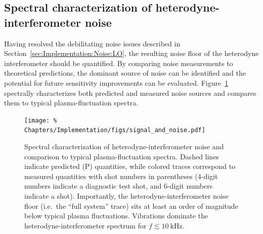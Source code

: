 \subsection{Spectral characterization of heterodyne-interferometer noise}
\label{sec:Implementation:Noise:interferometer}
Having resolved the debilitating noise issues described in
Section~\ref{sec:Implementation:Noise:LO},
the resulting noise floor of the heterodyne interferometer
should be quantified.
By comparing noise measurements to theoretical predictions,
the dominant source of noise can be identified and
the potential for future sensitivity improvements can be evaluated.
Figure~\ref{fig:Implementation:signal_and_noise}
spectrally characterizes both predicted and measured noise sources and
compares them to typical plasma-fluctuation spectra.

\begin{figure}
  \centering
  \texttt{[image: \%
    Chapters/Implementation/figs/signal\_and\_noise.pdf]}
  \caption[Spectral characterization of heterodyne-interferometer noise]{%
    Spectral characterization of heterodyne-interferometer noise and
    comparison to typical plasma-fluctuation spectra.
    Dashed lines indicate predicted (P) quantities, while
    colored traces correspond to measured quantities
    with shot numbers in parentheses
    ($4$-digit numbers indicate a diagnostic test shot, and
    $6$-digit numbers indicate a \diiid\space shot).
    Importantly, the heterodyne-interferometer noise floor
    (i.e.\ the ``full system'' trace)
    sits at least an order of magnitude below
    typical plasma fluctuations.
    Vibrations dominate the heterodyne-interferometer spectrum
    for $f \lesssim \SI{10}{\kilo\hertz}$.
  }
\label{fig:Implementation:signal_and_noise}
\end{figure}

